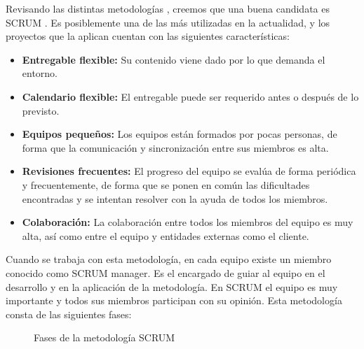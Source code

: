Revisando las distintas metodologías \cite{despa2014comparative}, creemos que una buena candidata es SCRUM \cite{schwaber1997scrum}. Es posiblemente una de las más utilizadas en la actualidad, y los proyectos que la aplican cuentan con las siguientes características:

\begin{itemize}
    \item \textbf{Entregable flexible:} Su contenido viene dado por lo que demanda el entorno. 
    \item \textbf{Calendario flexible:} El entregable puede ser requerido antes o después de lo previsto.
    \item \textbf{Equipos pequeños:} Los equipos están formados por pocas personas, de forma que la comunicación y sincronización entre sus miembros es alta. 
    \item \textbf{Revisiones frecuentes:} El progreso del equipo se evalúa de forma periódica y frecuentemente, de forma que se ponen en común las dificultades encontradas y se intentan resolver con la ayuda de todos los miembros.
    \item \textbf{Colaboración:} La colaboración entre todos los miembros del equipo es muy alta, así como entre el equipo y entidades externas como el cliente.
\end{itemize}

Cuando se trabaja con esta metodología, en cada equipo existe un miembro conocido como SCRUM manager. Es el encargado de guiar al equipo en el desarrollo y en la aplicación de la metodología. En SCRUM el equipo es muy importante y todos sus miembros participan con su opinión. Esta metodología consta de las siguientes fases:


\begin{figure}[H]
    \centering
        \caption{Fases de la metodología SCRUM \cite{schwaber1997scrum}} \label{fig:figura1}
    \end{figure}


